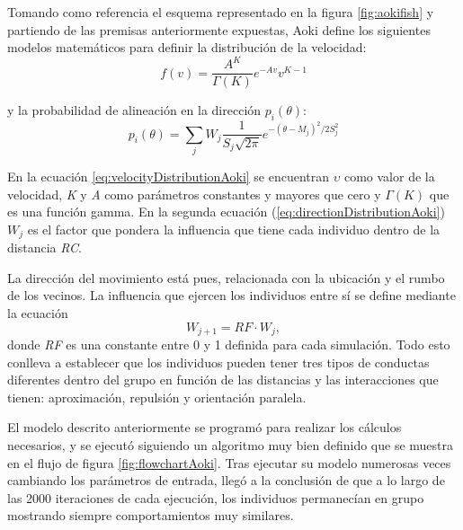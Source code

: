 Tomando como referencia el esquema representado en la figura \ref{fig:aokifish} y partiendo de las premisas anteriormente expuestas, Aoki define los siguientes modelos matemáticos para definir la distribución de la velocidad:
\begin{equation}\label{eq:velocityDistributionAoki} 
    f(v) = \displaystyle{\frac{A^{K}}{\Gamma (K)}}e^{-Av}v^{K-1}
\end{equation}

\noindent y la probabilidad de alineación en la dirección \(p_{i}(\theta)\):
\begin{equation}\label{eq:directionDistributionAoki}
    p_{i}(\theta)=\sum_{j}W_{j}\frac{1}{S_{j}\sqrt{2\pi}}e^{-(\theta -M_{j})^2/2S_{j}^2} 
\end{equation}


En la ecuación \ref{eq:velocityDistributionAoki} se encuentran  \(\upsilon\) como valor de la velocidad, \textit{K} y \textit{A} como parámetros constantes y mayores que cero y \(\Gamma(K)\) que es una función gamma. En la segunda ecuación (\ref{eq:directionDistributionAoki}) \(W_{j}\) es el factor que pondera la influencia que tiene cada individuo dentro de la distancia \textit{RC}. 

La dirección del movimiento está pues, relacionada con la ubicación y el rumbo de los vecinos. La influencia que ejercen los individuos entre sí se define mediante la ecuación$$ W_{j+1}=RF \cdot W_{j},$$ donde \textit{RF} es una constante entre 0 y 1 definida para cada simulación. Todo esto conlleva a establecer que los individuos pueden tener tres tipos de conductas diferentes dentro del grupo en función de las distancias y las interacciones que tienen: aproximación, repulsión y orientación paralela.

El modelo descrito anteriormente se programó para realizar los cálculos necesarios, y se ejecutó siguiendo un algoritmo muy bien definido que se muestra en el flujo de figura \ref{fig:flowchartAoki}. Tras ejecutar su modelo numerosas veces cambiando los parámetros de entrada, llegó a la conclusión de que a lo largo de las 2000 iteraciones de cada ejecución, los individuos permanecían en grupo mostrando siempre comportamientos muy similares. 


